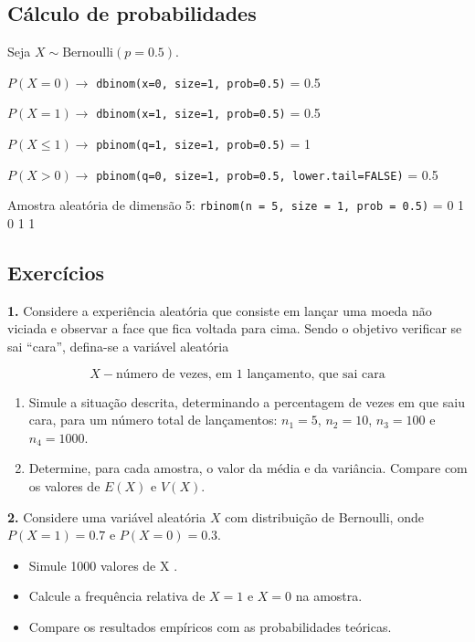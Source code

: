 \documentclass[
]{book}
\providecommand{\tightlist}{%
  \setlength{\itemsep}{0pt}\setlength{\parskip}{0pt}}
\begin{document}
\subsection{Cálculo de probabilidades}\label{cuxe1lculo-de-probabilidades}

Seja \(X \sim \text{Bernoulli}(p=0.5)\).

\(P(X=0) \to\) \texttt{dbinom(x=0,\ size=1,\ prob=0.5)} = 0.5

\(P(X=1) \to\) \texttt{dbinom(x=1,\ size=1,\ prob=0.5)} = 0.5

\(P(X \leq 1) \to\) \texttt{pbinom(q=1,\ size=1,\ prob=0.5)} = 1

\(P(X>0) \to\) \texttt{pbinom(q=0,\ size=1,\ prob=0.5,\ lower.tail=FALSE)} = 0.5

Amostra aleatória de dimensão 5: \texttt{rbinom(n\ =\ 5,\ size\ =\ 1,\ prob\ =\ 0.5)} = 0 1 0 1 1

\subsection{Exercícios}\label{exercuxedcios-24}

\textbf{1.} Considere a experiência aleatória que consiste em lançar
uma moeda não viciada e observar a face que fica voltada para cima.
Sendo o objetivo verificar se sai ``cara'', defina-se a variável aleatória

\[X - \text{número de vezes, em 1 lançamento, que sai cara}\]

\begin{enumerate}
\def\labelenumi{(\alph{enumi})}
\item
  Simule a situação descrita, determinando a percentagem de vezes em que saiu cara, para um número total de lançamentos: \(n_1 = 5\), \(n_2=10\), \(n_3=100\) e \(n_4=1000\).
\item
  Determine, para cada amostra, o valor da média e da variância. Compare com os valores de \(E(X)\) e \(V(X)\).
\end{enumerate}

\textbf{2.} Considere uma variável aleatória \(X\) com distribuição de Bernoulli, onde \(P(X = 1) = 0.7\) e \(P(X = 0) = 0.3\).

\begin{itemize}
\tightlist
\item
  Simule 1000 valores de X .
\item
  Calcule a frequência relativa de \(X = 1\) e \(X = 0\) na amostra.
\item
  Compare os resultados empíricos com as probabilidades teóricas.
\end{itemize}
\end{document}
